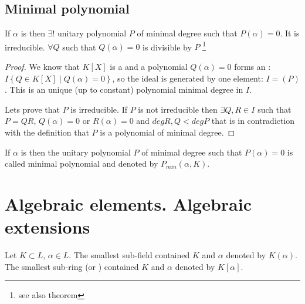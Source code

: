 \subsection{Minimal polynomial}

\begin{lemma}
  If $\alpha$ is  then
  $\exists!$ unitary polynomial $P$ of minimal degree such that
  $P\left(\alpha\right) = 0$. It is irreducible. $\forall Q$ such that
  $Q\left(\alpha\right) = 0$ is divisible by $P$
  \footnote{
    see also theorem 
  }
  \begin{proof}
    We know that $K\left[X\right]$ is a  and a
    polynomial $Q\left(\alpha\right) = 0$ forms an
    : $I \left\{Q \in K\left[X\right] \mid
    Q\left(\alpha\right) = 0 \right\}$, so the ideal is generated by
    one element: $I = \left(P\right)$. This is an unique (up to
    constant) polynomial minimal degree in $I$.
    
    Lets prove that $P$ is irreducible. If $P$ is not irreducible then
    $\exists Q,R \in I$ such that $P = Q 
    R$, $Q(\alpha) = 0$ or $R(\alpha) = 0$ and
    $deg R,Q < deg P$ that is in contradiction with the definition
    that $P$ is a polynomial of minimal degree.    
  \end{proof}
  \label{lem:minpolynomial}
\end{lemma}

\begin{definition}
  If $\alpha$ is  then
  the unitary polynomial $P$ of minimal degree such that
  $P\left(\alpha\right) = 0$ is called minimal polynomial and denoted
  by  $P_{min}\left(\alpha, K\right)$.
  \label{def:minpolynomial}
\end{definition}


\section{Algebraic elements. Algebraic extensions}

\begin{definition}
  Let $K \subset L$, $\alpha \in L$. The smallest sub-field contained
  $K$ and $\alpha$ denoted by $K\left(\alpha\right)$. The smallest
  sub-ring (or ) contained $K$ and $\alpha$ denoted by $K\left[\alpha\right]$.
\end{definition}

